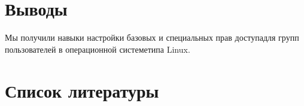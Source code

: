\documentclass[
  12pt,
  a4paper,
  DIV=11,
  numbers=noendperiod]{scrreprt}
\begin{document}
\chapter{Выводы}\label{ux432ux44bux432ux43eux434ux44b}

Мы получили навыки настройки базовых и специальных прав доступадля групп
пользователей в операционной системетипа Linux.

\chapter*{Список
литературы}\label{ux441ux43fux438ux441ux43eux43a-ux43bux438ux442ux435ux440ux430ux442ux443ux440ux44b}

\printbibliography[heading=none]
\end{document}
